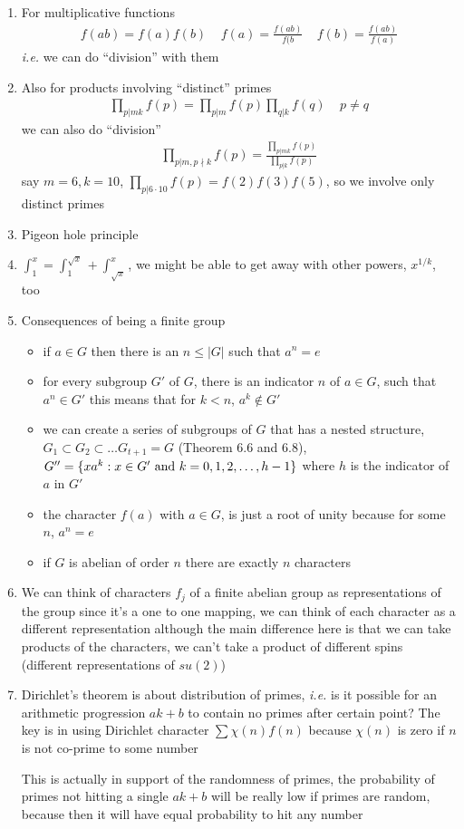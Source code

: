 \documentclass[aps,preprint,preprintnumbers,nofootinbib,showpacs,prd]{revtex4-1}
\newcommand{\ie}{{\it i.e.} }
\newcommand{\bit}{\begin{itemize}}
\newcommand{\eit}{\end{itemize}}
\newcommand{\nbea}{\begin{eqnarray*}}
\newcommand{\neea}{\end{eqnarray*}}
\begin{document}
\begin{enumerate}
\item For multiplicative functions
%
\nbea
f(ab) = f(a)f(b) ~~~~~ f(a) = \frac{f(ab)}{f(b} ~~~~~ f(b) = \frac{f(ab)}{f(a)}
\neea
%
\ie we can do ``division'' with them

\item Also for products involving ``distinct'' primes
%
\nbea
\prod_{p|mk} f(p) = \prod_{p|m}f(p) \prod_{q|k}f(q) ~~~~~ p \neq q
\neea
%
we can also do ``division''
%
\nbea
\prod_{p|m, p\nmid k} f(p) = \frac{\prod_{p|mk}f(p)}{\prod_{p|k}f(p)}
\neea
%
say $m = 6, k = 10$, $\prod_{p|6\cdot10} f(p) = f(2) f(3) f(5)$, so we involve only distinct primes

\item Pigeon hole principle

\item $\int_1^x = \int_1^{\sqrt{x}} + \int_{\sqrt{x}}^x$, we might be able to get away with other powers, $x^{1/k}$, too

\item Consequences of being a finite group
\bit
\item if $a \in G$ then there is an $n \le |G|$ such that $a^n = e$
\item for every subgroup $G'$ of $G$, there is an indicator $n$ of $a \in G$, such that $a^n \in G'$ this means that for $k < n$, $a^k \not\in G'$
\item we can create a series of subgroups of $G$ that has a nested structure, $G_1 \subset G_2 \subset \dots G_{t+1} = G$ (Theorem 6.6 and 6.8), $G'' = \{xa^k: x \in G' ~{\rm and} ~ k = 0,1,2,\dots,h-1\}$ where $h$ is the indicator of $a$ in $G'$
\item the character $f(a)$ with $a \in G$, is just a root of unity because for some $n$, $a^n = e$
\item if $G$ is abelian of order $n$ there are exactly $n$ characters


\eit

\item We can think of characters $f_j$ of a finite abelian group as representations of the group since it's a one to one mapping, we can think of each character as a different representation although the main difference here is that we can take products of the characters, we can't take a product of different spins (different representations of $su(2)$)


\item Dirichlet's theorem is about distribution of primes, \ie is it possible for an arithmetic progression $ak + b$ to contain no primes after certain point? The key is in using Dirichlet character $\sum \chi(n) f(n)$ because $\chi(n)$ is zero if $n$ is not co-prime to some number

This is actually in support of the randomness of primes, the probability of primes not hitting a single $ak + b$ will be really low if primes are random, because then it will have equal probability to hit any number













\end{enumerate}
\end{document}
